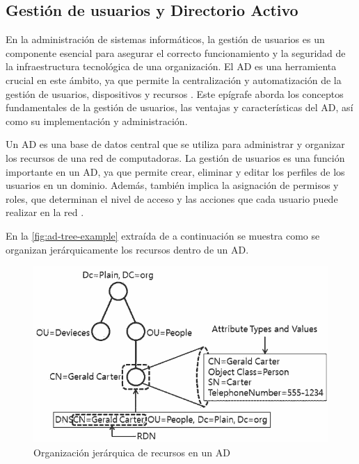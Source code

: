 \subsection{Gestión de usuarios y Directorio Activo}

En la administración de sistemas informáticos, la gestión de usuarios es un componente esencial para asegurar el correcto funcionamiento y la seguridad de la infraestructura tecnológica de una organización. El AD es una herramienta crucial en este ámbito, ya que permite la centralización y automatización de la gestión de usuarios, dispositivos y recursos \autocite{thakur_user_2015-1,josang_local_2015}. Este epígrafe aborda los conceptos fundamentales de la gestión de usuarios, las ventajas y características del AD, así como su implementación y administración.

Un AD es una base de datos central que se utiliza para administrar y organizar los recursos de una red de computadoras. La gestión de usuarios es una función importante en un AD, ya que permite crear, eliminar y editar los perfiles de los usuarios en un dominio. Además, también implica la asignación de permisos y roles, que determinan el nivel de acceso y las acciones que cada usuario puede realizar en la red \autocite{bartlett_samba_2005,dansimp_active_2023,imanudin_active_2019,allen_active_2003}.

En la \autoref{fig:ad-tree-example} extraída de \autocite{carter_ldap_2003} a continuación se muestra como se organizan jerárquicamente los recursos dentro de un AD.

\begin{figure}[H]
    \centering
    \includegraphics[width=\linewidth]{images/ad-tree-2.png}
    \caption{Organización jerárquica de recursos en un AD}
    \label{fig:ad-tree-example}
\end{figure}

